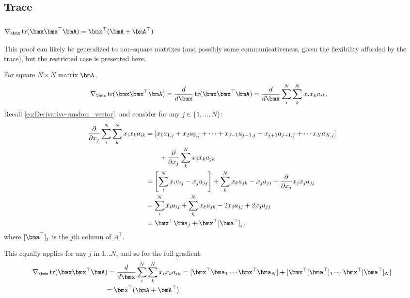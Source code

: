 \documentclass[11pt]{article}
\DeclareMathOperator{\Trace}{tr}
\begin{document}
\subsection{Trace}
\subsubsection{\hyperref[sec:Trace-Derivative-tr(xx'A)]{$\nabla_{\bmx}\Trace(\bmx \bmx^\top \bmA) = \bmx^\top (\bmA + \bmA^\top)$}}
\label{proof:Trace-Derivative-tr(xx'A)}
This proof can likely be generalized to non-square matrixes (and possibly some communicativeness, given the flexibility afforded by the trace), but the restricted case is presented here.

For square $N\times N$ matrix $\bmA$,
\begin{align*}
\nabla_{\bmx}\Trace(\bmx \bmx^\top \bmA) =
\frac{d}{d \bmx}\Trace(\bmx \bmx^\top \bmA) &=
\frac{d}{d \bmx} \sum_{i}^{N} \sum_{k}^{N} x_i x_k a_{ik}.
\end{align*}
Recall \cref{eq:Derivative-random_vector}, and consider for any $j \in \{1,\ldots, N\}$:
\begin{align*}
\frac{\partial}{\partial x_j} \sum_{i}^{N} \sum_{k}^{N} x_i x_k a_{ik} &=
[x_1a_{1,j} + x_2a_{2,j} + \cdots + x_{j-1}a_{j-1,j} + x_{j+1}a_{j+1,j} + \cdots x_N a_{N,j}] \\ &\qquad + \frac{\partial}{\partial x_j} \sum_{k}^{N} x_j x_k a_{jk} \\
&= \left[\sum_i^N x_ia_{ij} - x_ja_{jj}\right] + \sum_{k}^{N} x_k a_{jk} - x_ja_{jj} + \frac{\partial}{\partial x_j} x_j x_j a_{jj} \\
&= \sum_i^N x_ia_{ij} + \sum_{k}^{N} x_k a_{jk} - 2 x_ja_{jj} + 2 x_ja_{jj} \\
&= \bmx^\top \bma_j + \bmx^\top [\bma^\top]_j,
\end{align*}
where $[\bma^\top]_j$ is the $j$th column of $A^\top$.

This equally applies for any $j$ in $1\ldots N$, and so for the full gradient:
\begin{align*}
\nabla_{\bmx}\Trace(\bmx \bmx^\top \bmA) =
\frac{d}{d \bmx} \sum_{i}^{N} \sum_{k}^{N} x_i x_k a_{ik} &=
[\bmx^\top \bma_1 \cdots \bmx^\top \bma_N] + [\bmx^\top [\bma^\top]_1 \cdots \bmx^\top [\bma^\top]_N] \\
= \bmx^\top (\bmA + \bmA^\top).
\end{align*}
\end{document}
